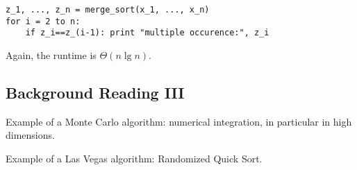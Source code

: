 \documentclass[a4paper]{article}
\begin{document}
\begin{verbatim}
z_1, ..., z_n = merge_sort(x_1, ..., x_n)
for i = 2 to n:
    if z_i==z_(i-1): print "multiple occurence:", z_i
\end{verbatim}

Again, the runtime is $\Theta(n \lg n)$.

\subsection{Background Reading III}

Example of a Monte Carlo algorithm: numerical integration, in particular in high
dimensions.

\noindent Example of a Las Vegas algorithm: Randomized Quick Sort.
\end{document}
